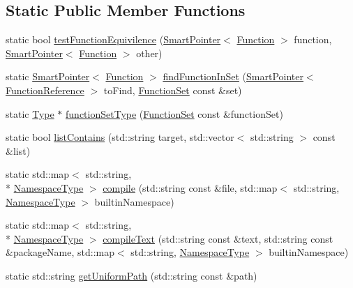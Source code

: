\subsection*{Static Public Member Functions}
\begin{DoxyCompactItemize}
\item 
static bool \hyperlink{class_scribble_core_1_1_parser_a6f3623acbf4ecf36d07d8e08393d5755}{test\-Function\-Equivilence} (\hyperlink{_smart_pointer_8hpp_afdd8d4ba81c3fcbdeacf1dafba2accfb}{Smart\-Pointer}$<$ \hyperlink{class_a_p_i_1_1_function}{Function} $>$ function, \hyperlink{_smart_pointer_8hpp_afdd8d4ba81c3fcbdeacf1dafba2accfb}{Smart\-Pointer}$<$ \hyperlink{class_a_p_i_1_1_function}{Function} $>$ other)
\item 
static \hyperlink{_smart_pointer_8hpp_afdd8d4ba81c3fcbdeacf1dafba2accfb}{Smart\-Pointer}$<$ \hyperlink{class_a_p_i_1_1_function}{Function} $>$ \hyperlink{class_scribble_core_1_1_parser_a4d9e4e3d19bad8b983cbff320ba40ad1}{find\-Function\-In\-Set} (\hyperlink{_smart_pointer_8hpp_afdd8d4ba81c3fcbdeacf1dafba2accfb}{Smart\-Pointer}$<$ \hyperlink{class_scribble_core_1_1_function_reference}{Function\-Reference} $>$ to\-Find, \hyperlink{namespace_scribble_core_a9e40b3081eb67f0c92c1d1d5041495cf}{Function\-Set} const \&set)
\item 
static \hyperlink{class_scribble_core_1_1_type}{Type} $\ast$ \hyperlink{class_scribble_core_1_1_parser_a0e1829847a648294f57e634fa7b21782}{function\-Set\-Type} (\hyperlink{namespace_scribble_core_a9e40b3081eb67f0c92c1d1d5041495cf}{Function\-Set} const \&function\-Set)
\item 
static bool \hyperlink{class_scribble_core_1_1_parser_a13bb70c6085507b7dcd5fccc7f20d37c}{list\-Contains} (std\-::string target, std\-::vector$<$ std\-::string $>$ const \&list)
\item 
static std\-::map$<$ std\-::string, \\*
\hyperlink{namespace_scribble_core_acf9f6e70f7e422fafa73920c31cff3cb}{Namespace\-Type} $>$ \hyperlink{class_scribble_core_1_1_parser_a6868988e45190dbb366f834b33505902}{compile} (std\-::string const \&file, std\-::map$<$ std\-::string, \hyperlink{namespace_scribble_core_acf9f6e70f7e422fafa73920c31cff3cb}{Namespace\-Type} $>$ builtin\-Namespace)
\item 
static std\-::map$<$ std\-::string, \\*
\hyperlink{namespace_scribble_core_acf9f6e70f7e422fafa73920c31cff3cb}{Namespace\-Type} $>$ \hyperlink{class_scribble_core_1_1_parser_a1aaaf22583e0bf60a1e27227bed9511b}{compile\-Text} (std\-::string const \&text, std\-::string const \&package\-Name, std\-::map$<$ std\-::string, \hyperlink{namespace_scribble_core_acf9f6e70f7e422fafa73920c31cff3cb}{Namespace\-Type} $>$ builtin\-Namespace)
\item 
static std\-::string \hyperlink{class_scribble_core_1_1_parser_aa052d5111bdc10523060670714b409ab}{get\-Uniform\-Path} (std\-::string const \&path)
\end{DoxyCompactItemize}


